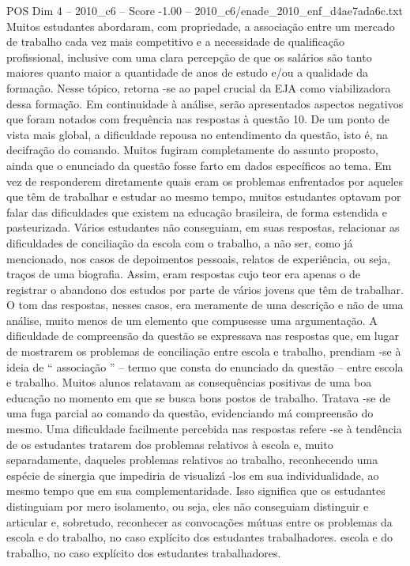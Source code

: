 \begin{textsample}{POS Dim 4 – 2010\_c6 – Score -1.00 – 2010\_c6/enade\_2010\_enf\_d4ae7ada6c.txt}
Muitos estudantes abordaram, com propriedade, a associação entre um mercado de trabalho cada vez mais competitivo e a necessidade de qualificação profissional, inclusive com uma clara percepção de que os salários são tanto maiores quanto maior a quantidade de anos de estudo e/ou a qualidade da formação.
Nesse tópico, retorna -se ao papel crucial da EJA como viabilizadora dessa formação.
Em continuidade à análise, serão apresentados aspectos negativos que foram notados com frequência nas respostas à questão 10.
De um ponto de vista mais global, a dificuldade repousa no entendimento da questão, isto é, na decifração do comando.
Muitos fugiram completamente do assunto proposto, ainda que o enunciado da questão fosse farto em dados específicos ao tema.
Em vez de responderem diretamente quais eram os problemas enfrentados por aqueles que têm de trabalhar e estudar ao mesmo tempo, muitos estudantes optavam por falar das dificuldades que existem na educação brasileira, de forma estendida e pasteurizada.
Vários estudantes não conseguiam, em suas respostas, relacionar as dificuldades de conciliação da escola com o trabalho, a não ser, como já mencionado, nos casos de depoimentos pessoais, relatos de experiência, ou seja, traços de uma biografia.
Assim, eram respostas cujo teor era apenas o de registrar o abandono dos estudos por parte de vários jovens que têm de trabalhar.
O tom das respostas, nesses casos, era meramente de uma descrição e não de uma análise, muito menos de um elemento que compusesse uma argumentação.
A dificuldade de compreensão da questão se expressava nas respostas que, em lugar de mostrarem os problemas de conciliação entre escola e trabalho, prendiam -se à ideia de “ associação ” – termo que consta do enunciado da questão – entre escola e trabalho.
Muitos alunos relatavam as consequências positivas de uma boa educação no momento em que se busca bons postos de trabalho.
Tratava -se de uma fuga parcial ao comando da questão, evidenciando má compreensão do mesmo.
Uma dificuldade facilmente percebida nas respostas refere -se à tendência de os estudantes tratarem dos problemas relativos à escola e, muito separadamente, daqueles problemas relativos ao trabalho, reconhecendo uma espécie de sinergia que impediria de visualizá -los em sua individualidade, ao mesmo tempo que em sua complementaridade.
Isso significa que os estudantes distinguiam por mero isolamento, ou seja, eles não conseguiam distinguir e articular e, sobretudo, reconhecer as convocações mútuas entre os problemas da escola e do trabalho, no caso explícito dos estudantes trabalhadores. escola e do trabalho, no caso explícito dos estudantes trabalhadores.

\end{textsample}

